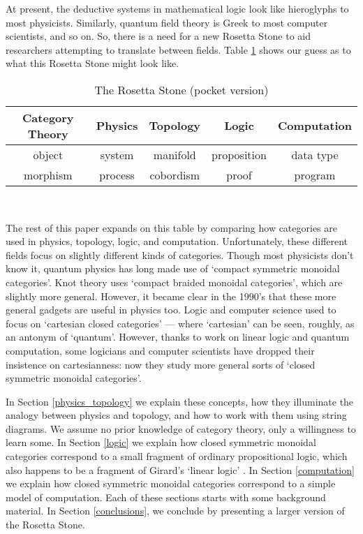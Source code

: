 \documentclass[12pt]{article}
\begin{document}
At present, the deductive systems in mathematical logic look like hieroglyphs
to most physicists.  Similarly, quantum field theory is Greek to most
computer scientists, and so on.  So, there is a need for a new Rosetta
Stone to aid researchers attempting to translate between fields. 
Table \ref{analogy} shows our guess as to what this Rosetta
Stone might look like.  

\begin{table}[h]
\begin{center}
\begin{tabular}{|c|c|c|c|c|}
\hline
Category Theory  &  Physics &   Topology  &  Logic       &  Computation \\
\hline
object           &  system  &  manifold   &  proposition &  data type \\ 
\hline
morphism         &  process &  cobordism  &  proof       &  program  \\
\hline
\end{tabular}
\\
\caption{The Rosetta Stone (pocket version)}
\label{analogy}
\end{center}
\end{table}
The rest of this paper expands on this table by comparing how
categories are used in physics, topology, logic, and computation.
Unfortunately, these different fields focus on slightly
different kinds of categories.  Though most physicists don't know it, 
quantum physics has long made use of `compact symmetric 
monoidal categories'.  Knot theory uses 
`compact braided monoidal categories', which are slightly more general.  
However, it became clear in the 1990's
that these more general gadgets are useful in physics too.  
Logic and computer science used to focus on `cartesian closed categories' --- 
where `cartesian' can be seen, roughly, as an antonym of `quantum'.  
However, thanks to work on linear logic and quantum computation, some 
logicians and computer scientists have dropped their insistence on 
cartesianness: now they study more general sorts of `closed symmetric 
monoidal categories'.

In Section \ref{physics_topology} we explain these concepts,
how they illuminate the analogy between physics and topology, and 
how to work with them using string diagrams.  We assume no prior 
knowledge of category theory, only a willingness to learn some.  
In Section \ref{logic} we explain how closed symmetric monoidal
categories correspond to a small fragment of ordinary 
propositional logic, which also happens to be a fragment of Girard's 
`linear logic' \cite{Girard1}.   In Section \ref{computation} 
we explain how closed symmetric monoidal categories correspond to a 
simple model of computation.   Each of these sections starts with
some background material.  In Section \ref{conclusions}, we conclude
by presenting a larger version of the Rosetta Stone.
\end{document}
